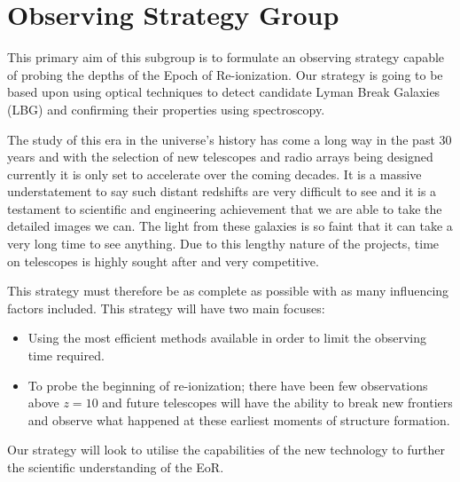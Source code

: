 \section{Observing Strategy Group} %
\label{sec:observing_strategy_group}
	This primary aim of this subgroup is to formulate an observing strategy capable of probing the depths of the Epoch of Re-ionization. Our strategy is going to be based upon using optical techniques to detect candidate Lyman Break Galaxies (LBG) and confirming their properties using spectroscopy.

	The study of this era in the universe's history has come a long way in the past 30 years and with the selection of new telescopes and radio arrays being designed currently it is only set to accelerate over the coming decades. It is a massive understatement to say such distant redshifts are very difficult to see and it is a testament to scientific and engineering achievement that we are able to take the detailed images we can. The light from these galaxies is so faint that it can take a very long time to see anything. Due to this lengthy nature of the projects, time on telescopes is highly sought after and very competitive.

	This strategy must therefore be as complete as possible with as many influencing factors included. This strategy will have two main focuses:
	\begin{itemize}
		\item Using the most efficient methods available in order to limit the observing time required.
		\item To probe the beginning of re-ionization; there have been few observations above $z=10$ and future telescopes will have the ability to break new frontiers and observe what happened at these earliest moments of structure formation.
	\end{itemize}

	Our strategy will look to utilise the capabilities of the new technology to further the scientific understanding of the EoR.

